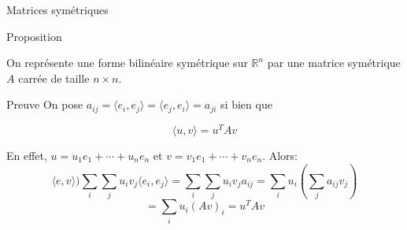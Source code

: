         \begin{parag}{Matrices symétriques}
            \begin{subparag}{Proposition}
                \begin{theoreme}
                    On représente une forme bilinéaire symétrique sur $\mathbb{R}^n$ par une matrice symétrique $A$ carrée de taille $n \times n$.
                \end{theoreme}
            \end{subparag}
            \begin{subparag}{Preuve}
                On pose $a_{ij} = \langle e_i, e_j\rangle = \langle e_j, e_i \rangle = a_{ji}$ si bien que 
                \begin{formule}
                    \[\langle u, v \rangle  = u^TAv\]
                \end{formule}
                En effet, $u = u_1e_1 + \cdots +u_ne_n$ et $v = v_1e_1 + \cdots + v_ne_n$. Alors:
                \[\langle e, v \rangle )\sum_i \sum_j u_iv_j\langle e_i, e_j\rangle = \sum_i \sum_j u_iv_ja_{ij} = \sum_i u_i\left(\sum_j a_{ij}v_j \right)\]
                \[= \sum_i u_i(Av)_i = u^TAv\]
            \end{subparag}
\end{parag}
